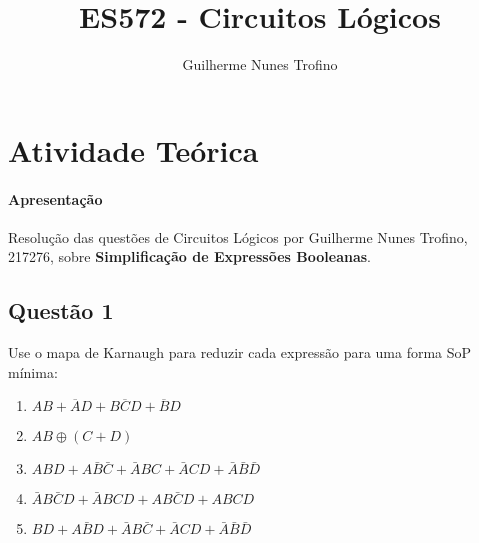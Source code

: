 \documentclass{article}
\title{ES572 - Circuitos Lógicos}
\author{Guilherme Nunes Trofino}
\begin{document}
    \maketitle
\newpage

    \section{Atividade Teórica}
        \paragraph{Apresentação}Resolução das questões de Circuitos Lógicos por Guilherme Nunes Trofino, 217276, sobre \textbf{Simplificação de Expressões Booleanas}.

        \subsection{Questão 1}
            \begin{exercise}
                Use o mapa de Karnaugh para reduzir cada expressão para uma forma SoP mínima:
                \begin{enumerate}[label=(\alph*), rightmargin = \leftmargin]
                    \item $AB + \overline{A}D + B\overline{C}D + \overline{B}D$
                    \item $AB \oplus (C+D)$
                    \item $ABD + A\bar{B}\bar{C} + \bar{A}BC + \bar{A}CD + \bar{A}\bar{B}\bar{D}$
                    \item $\bar{A}B\bar{C}D + \bar{A}BCD + AB\bar{C}D + ABCD$
                    \item $BD + A\bar{B}D + \bar{A}B\bar{C} + \bar{A}CD + \bar{A}\bar{B}\bar{D}$
                \end{enumerate}
            \end{exercise}
\end{document}
